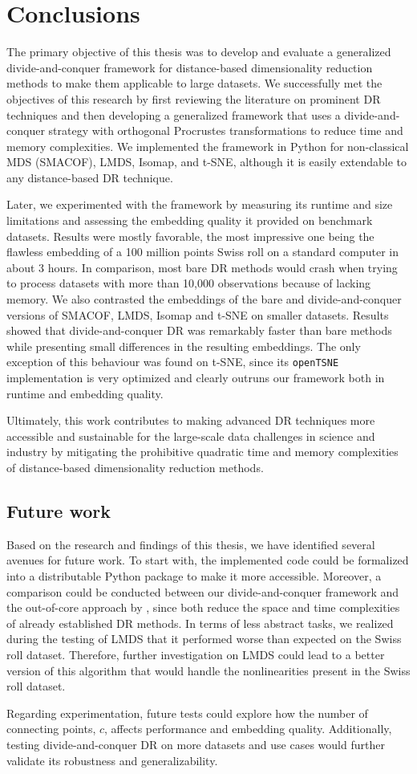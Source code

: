 \section{Conclusions}

The primary objective of this thesis was to develop and evaluate a generalized divide-and-conquer framework for distance-based dimensionality reduction methods to make them applicable to large datasets. We successfully met the objectives of this research by first reviewing the literature on prominent DR techniques and then developing a generalized framework that uses a divide-and-conquer strategy with orthogonal Procrustes transformations to reduce time and memory complexities. We implemented the framework in Python for non-classical MDS (SMACOF), LMDS, Isomap, and t-SNE, although it is easily extendable to any distance-based DR technique.

Later, we experimented with the framework by measuring its runtime and size limitations and assessing the embedding quality it provided on benchmark datasets. Results were mostly favorable, the most impressive one being the flawless embedding of a 100 million points Swiss roll on a standard computer in about 3 hours. In comparison, most bare DR methods would crash when trying to process datasets with more than 10,000 observations because of lacking memory. We also contrasted the embeddings of the bare and divide-and-conquer versions of SMACOF, LMDS, Isomap and t-SNE on smaller datasets. Results showed that divide-and-conquer DR was remarkably faster than bare methods while presenting small differences in the resulting embeddings. The only exception of this behaviour was found on t-SNE, since its \verb|openTSNE| implementation is very optimized and clearly outruns our framework both in runtime and embedding quality.

Ultimately, this work contributes to making advanced DR techniques more accessible and sustainable for the large-scale data challenges in science and industry by mitigating the prohibitive quadratic time and memory complexities of distance-based dimensionality reduction methods.

\subsection{Future work}

Based on the research and findings of this thesis, we have identified several avenues for future work. To start with, the implemented code could be formalized into a distributable Python package to make it more accessible. Moreover, a comparison could be conducted between our divide-and-conquer framework and the out-of-core approach by \citet{Reichmann2024}, since both reduce the space and time complexities of already established DR methods. In terms of less abstract tasks, we realized during the testing of LMDS that it performed worse than expected on the Swiss roll dataset. Therefore, further investigation on LMDS could lead to a better version of this algorithm that would handle the nonlinearities present in the Swiss roll dataset.

Regarding experimentation, future tests could explore how the number of connecting points, $c$, affects performance and embedding quality. Additionally, testing divide-and-conquer DR on more datasets and use cases would further validate its robustness and generalizability.